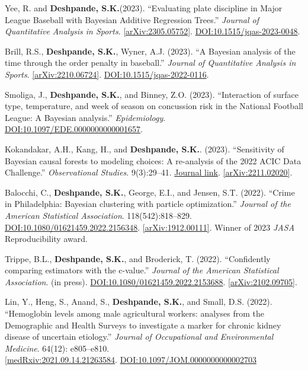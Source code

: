\documentclass[margin]{res}
\def\skd{\textbf{Deshpande, S.K.}}
\begin{document}
\begin{resume}
Yee, R. and \skd (2023). ``Evaluating plate discipline in Major League Baseball with Bayesian Additive Regression Trees.'' \textit{Journal of Quantitative Analysis in Sports}. \href{https://arxiv.org/abs/2305.05752}{[arXiv:2305.05752]}. \href{https://doi.org/10.1515/jqas-2023-0048}{DOI:10.1515/jqas-2023-0048}.

Brill, R.S., \skd, Wyner, A.J. (2023). ``A Bayesian analysis of the time through the order penalty in baseball.'' \textit{Journal of Quantitative Analysis in Sports}. \href{https://arxiv.org/abs/2210.06724}{[arXiv:2210.06724]}. \href{https://doi.org/10.1515/jqas-2022-0116}{DOI:10.1515/jqas-2022-0116}.

Smoliga, J., \skd, and Binney, Z.O. (2023). ``Interaction of surface type, temperature, and week of season on concussion risk in the National Football League: A {Bayesian} analysis.'' \textit{Epidemiology}. \href{https://doi.org/10.1097/EDE.0000000000001657}{DOI:10.1097/EDE.0000000000001657}.

Kokandakar, A.H., Kang, H., and \skd. (2023). ``Sensitivity of Bayesian causal forests to modeling choices: A re-analysis of the 2022 ACIC Data Challenge.'' \textit{Observational Studies}. 9(3):29--41. \href{https://muse.jhu.edu/pub/56/article/895651}{Journal link}. \href{https://arxiv.org/abs/2211.02020}{[arXiv:2211.02020]}.

Balocchi, C., \skd, George, E.I., and Jensen, S.T. (2022). ``Crime in Philadelphia: Bayesian clustering with particle optimization.'' \textit{Journal of the American Statistical Association}. 118(542):818--829.
\href{https://doi.org/10.1080/01621459.2022.2156348}{DOI:10.1080/01621459.2022.2156348}. \href{https://arxiv.org/abs/1912.00111}{[arXiv:1912.00111]}. Winner of 2023 \textit{JASA} Reproducibility award.

Trippe, B.L., \skd, and Broderick, T. (2022). ``Confidently comparing estimators with the c-value.'' \textit{Journal of the American Statistical Association}. (in press). \href{https://doi.org/10.1080/01621459.2022.2153688}{DOI:10.1080/01621459.2022.2153688}. \href{https://arxiv.org/abs/2102.09705}{[arXiv:2102.09705]}. 

Lin, Y., Heng, S., Anand, S., \skd, and Small, D.S. (2022). ``Hemoglobin levels among male agricultural workers: analyses from the Demographic and Health Surveys to investigate a marker for chronic kidney disease of uncertain etiology.'' \textit{Journal of Occupational and Environmental Medicine}. 64(12): e805--e810. \\ \href{https://www.medrxiv.org/content/10.1101/2021.09.14.21263584v2}{[medRxiv:2021.09.14.21263584}. \href{https://doi.org/10.1097/JOM.0000000000002703}{DOI:10.1097/JOM.0000000000002703}


\end{resume}
\end{document}
